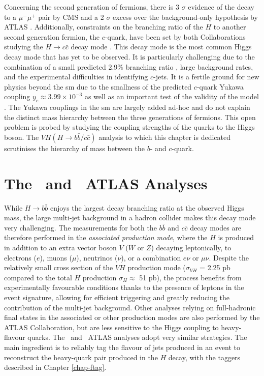 Concerning the second generation of fermions, there is 3 $\sigma$ evidence of the decay to a $\mu^-\mu^+$ pair by CMS \cite{CMS:2020xwi} and a 2 $\sigma$ excess over the background-only hypothesis by ATLAS \cite{ATLAS:2020fzp}. Additionally, constraints on the branching ratio of the $H$ to another second generation fermion, the $c$-quark, have been set by both Collaborations studying the $H \rightarrow c\bar{c}$ decay mode \cite{Aaboud:2018fhh}. This decay mode is the most common Higgs decay mode that has yet to be observed. It is particularly challenging due to the combination of a small predicted 2.9\% branching ratio \cite{DJOUADI199856}, large background rates, and the experimental difficulties in identifying $c$-jets. It is a fertile ground for new physics beyond the \gls{sm} due to the smallness of the predicted $c$-quark Yukawa coupling $y_c \approx 3.99 \times 10^{-3} $ \cite{yukawac} as well as an important test of the validity of the model \cite{PhysRevD.89.033014,PhysRevD.92.033016,Botella:2016krk,PhysRevD.98.055001,GHOSH2016504,PhysRevLett.123.031802,PhysRevD.100.115041}. The Yukawa couplings in the \gls{sm} are largely added ad-hoc and do not explain the distinct mass hierarchy between the three generations of fermions. This open problem is probed by studying the coupling strengths of the quarks to the Higgs boson. The $VH (H \rightarrow b\bar{b}/c\bar{c})$ analysis to which this chapter is dedicated scrutinises the hierarchy of mass between the $b$- and $c$-quark.

\section[The \vhb\ and \vhc\ ATLAS Analyses]{The \boldvhb\ and \boldvhc\ ATLAS Analyses}
While $H \rightarrow b\bar{b}$ enjoys the largest decay branching ratio at the observed Higgs mass, the large multi-jet background in a hadron collider makes this decay mode very challenging. The measurements for both the $b\bar{b}$ and $c\bar{c}$ decay modes are therefore performed in the \textit{associated production mode}, where the $H$ is produced in addition to an extra vector boson $V$ ($W$ or $Z$) decaying leptonically, to electrons ($e$), muons ($\mu$), neutrinos ($\nu$), or a combination $e\nu$ or $\mu\nu$. Despite the relatively small cross section of the $VH$ production mode ($\sigma_{VH}$ = 2.25 pb compared to the total $H$ production $\sigma_H \approx$ 51 pb), the process benefits from experimentally favourable conditions thanks to the presence of leptons in the event signature, allowing for efficient triggering and greatly reducing the contribution of the multi-jet background. Other analyses relying on full-hadronic final states in the associated or other production modes are also performed by the ATLAS Collaboration, but are less sensitive to the Higgs coupling to heavy-flavour quarks. The \vhb\ and \vhc\ ATLAS analyses adopt very similar strategies. The main ingredient is to reliably tag the flavour of jets produced in an event to reconstruct the heavy-quark pair produced in the $H$ decay, with the taggers described in Chapter \ref{chap-ftag}. \\ 

